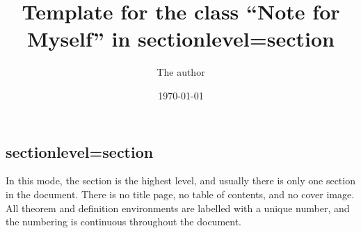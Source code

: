 \documentclass{noteformyself}
\title{Template for the class ``Note for Myself'' in sectionlevel=section}
\author{The author}
\date{\today}
\begin{document}
    \maketitle



    \subsection{sectionlevel=section}

    In this mode, the section is the highest level, and usually there is only one section in the document. 
    There is no title page, no table of contents, and no cover image.
    All theorem and definition environments are labelled with a unique number, and the numbering is continuous throughout the document.


\end{document}
